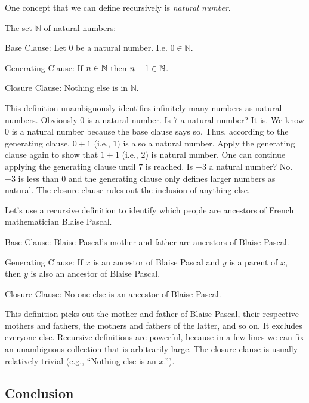 \noindent{}One concept that we can define recursively is \emph{natural number}.
\begin{majorILnc}{} The set $\mathbb{N}$ of natural numbers:
	\begin{cenumerate}
		\item Base Clause: Let $0$ be a natural number. I.e. $0 \in \mathbb{N}$.
		\item Generating Clause: If $n \in \mathbb{N}$ then $n+1 \in \mathbb{N}$.
		\item Closure Clause: Nothing else is in $\mathbb{N}$.  
	\end{cenumerate}
\end{majorILnc}
This definition unambiguously identifies infinitely many numbers as natural numbers. 
Obviously $0$ is a natural number. 
Is $7$ a natural number? 
It is. We know $0$ is a natural number because the base clause says so. 
Thus, according to the generating clause, $0+1$ (i.e., $1$) is also a natural number. Apply the generating clause again to show that $1+1$ (i.e., $2$) is natural number. One can continue applying the generating clause until $7$ is reached. 
Is $-3$ a natural number? No. $-3$ is less than $0$ and the generating clause only defines larger numbers as natural. The closure clause rules out the inclusion of anything else.

Let's use a recursive definition to identify which people are ancestors of French mathematician Blaise Pascal.

\begin{cenumerate}
	\item Base Clause: Blaise Pascal's mother and father are ancestors of Blaise Pascal.
	\item Generating Clause: If $x$ is an ancestor of Blaise Pascal and $y$ is a parent of $x$, then $y$ is also an ancestor of Blaise Pascal.
	\item Closure Clause: No one else is an ancestor of Blaise Pascal.
\end{cenumerate}
\noindent{}This definition picks out the mother and father of Blaise Pascal, their respective mothers and fathers, the mothers and fathers of the latter, and so on.  It excludes everyone else. Recursive definitions are powerful, because in a few lines we can fix an unambiguous collection that is arbitrarily large. The closure clause is usually relatively trivial (e.g., ``Nothing else is an $x$.'').

\subsection{Conclusion}\label{Conclusion}

